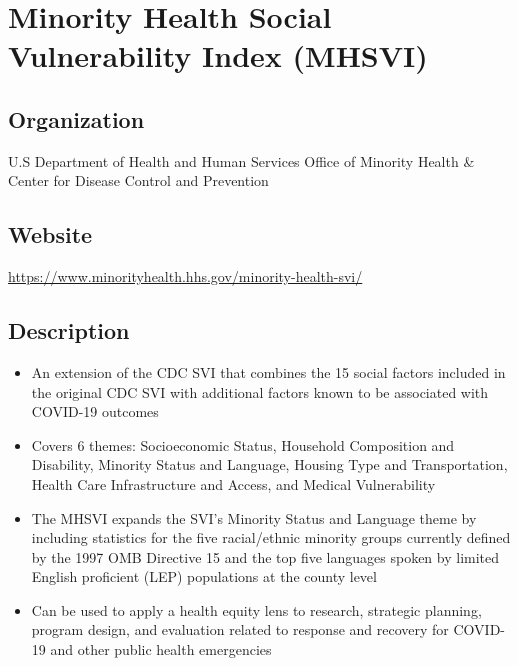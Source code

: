\documentclass[
]{book}
\providecommand{\tightlist}{%
  \setlength{\itemsep}{0pt}\setlength{\parskip}{0pt}}
\begin{document}
\mainmatter

\hypertarget{minority-health-social-vulnerability-index-mhsvi}{%
\chapter{Minority Health Social Vulnerability Index (MHSVI)}\label{minority-health-social-vulnerability-index-mhsvi}}

\hypertarget{organization-41}{%
\section{Organization}\label{organization-41}}

U.S Department of Health and Human Services Office of Minority Health \& Center for Disease Control and Prevention

\hypertarget{website-41}{%
\section{Website}\label{website-41}}

\url{https://www.minorityhealth.hhs.gov/minority-health-svi/}

\hypertarget{description-41}{%
\section{Description}\label{description-41}}

\begin{itemize}
\tightlist
\item
  An extension of the CDC SVI that combines the 15 social factors included in the original CDC SVI with additional factors known to be associated with COVID-19 outcomes
\item
  Covers 6 themes: Socioeconomic Status, Household Composition and Disability, Minority Status and Language, Housing Type and Transportation, Health Care Infrastructure and Access, and Medical Vulnerability
\item
  The MHSVI expands the SVI's Minority Status and Language theme by including statistics for the five racial/ethnic minority groups currently defined by the 1997 OMB Directive 15 and the top five languages spoken by limited English proficient (LEP) populations at the county level
\item
  Can be used to apply a health equity lens to research, strategic planning, program design, and evaluation related to response and recovery for COVID-19 and other public health emergencies
\end{itemize}
\end{document}
